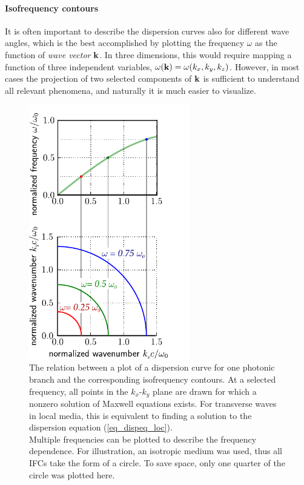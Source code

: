 \paragraph{Isofrequency contours}  %
It is often important to describe the dispersion curves also for different wave angles, which is the best accomplished by plotting the  %
frequency $\omega$ as the function of \textit{wave vector} ${\mathbf{k}}$. In three dimensions, this would require mapping a function of three independent variables, $\omega({\mathbf{k}}) = \omega(k_x, k_y, k_z)$. However, in most cases the projection of two selected components of ${\mathbf{k}}$ is sufficient to understand all relevant phenomena, and naturally it is much easier to visualize. 
\begin{figure}
  \begin{minipage}[c]{0.5\textwidth}
\hfill
    \includegraphics[width=7cm]{img/dispersion_curves_to_ifc.pdf}
  \end{minipage}
  \begin{minipage}[c]{0.5\textwidth}
    \caption{The relation between a plot of a dispersion curve for one photonic branch and the corresponding isofrequency contours. At a selected frequency, all points in the $k_x$-$k_y$ plane are drawn for which a nonzero solution of Maxwell equations exists. For transverse waves in local media, this is equivalent to finding a solution to the dispersion equation (\ref{eq_dispeq_loc}).\\Multiple frequencies can be plotted to describe the frequency dependence. For illustration, an isotropic medium was used, thus all IFCs take the form of a circle. To save space, only one quarter of the circle was plotted here.} \label{fg_ifc_dc}
  \end{minipage}
\end{figure}

